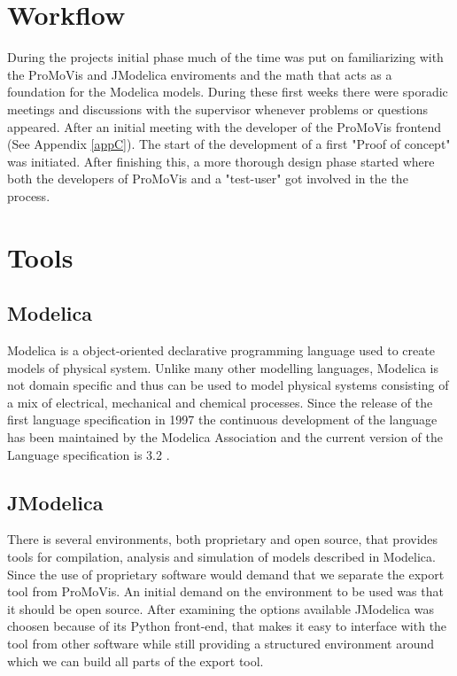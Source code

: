 \section{Workflow}
During the projects initial phase much of the time was put on familiarizing with the ProMoVis and JModelica enviroments and the math that acts as a foundation for the Modelica models. During these first weeks there were sporadic meetings and discussions with the supervisor whenever problems or questions appeared. After an initial meeting with the developer of the ProMoVis frontend (See Appendix \ref{appC}). The start of the development of a first "Proof of concept" was initiated. After finishing this, a more thorough design phase started where both the developers of ProMoVis and a "test-user" got involved in the the process. 
\section{Tools}
\subsection{Modelica}
Modelica is a object-oriented declarative programming language used to create models of physical system. Unlike many other modelling languages, Modelica is not domain specific and thus can be used to model physical systems consisting of a mix of electrical, mechanical and chemical processes. Since the release of the first language specification in 1997 the continuous development of the language has been maintained by the Modelica Association and the current version of the Language specification is 3.2 \cite{ModelicaSpec}.\nocite{*}
\subsection{JModelica}
There is several environments, both proprietary and open source, that provides tools for compilation, analysis and simulation of  models described in Modelica. Since the use of proprietary software would demand that we separate the export tool from ProMoVis. An initial demand on the environment to be used was that it should be open source. After examining the options available JModelica\cite{jmodelicaorg}\nocite{*} was choosen because of its Python front-end, that makes it easy to interface with the tool from other software while still providing a structured environment around which we can build all parts of the export tool.   
